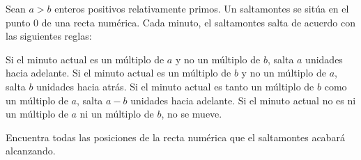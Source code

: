 Sean $a > b$ enteros positivos relativamente primos. Un saltamontes se sitúa en el punto $0$ de una recta numérica. Cada minuto, el saltamontes salta de acuerdo con las siguientes reglas:

    Si el minuto actual es un múltiplo de $a$ y no un múltiplo de $b$, salta $a$ unidades hacia adelante.
    Si el minuto actual es un múltiplo de $b$ y no un múltiplo de $a$, salta $b$ unidades hacia atrás.
    Si el minuto actual es tanto un múltiplo de $b$ como un múltiplo de $a$, salta $a - b$ unidades hacia adelante.
    Si el minuto actual no es ni un múltiplo de $a$ ni un múltiplo de $b$, no se mueve.

Encuentra todas las posiciones de la recta numérica que el saltamontes acabará alcanzando.